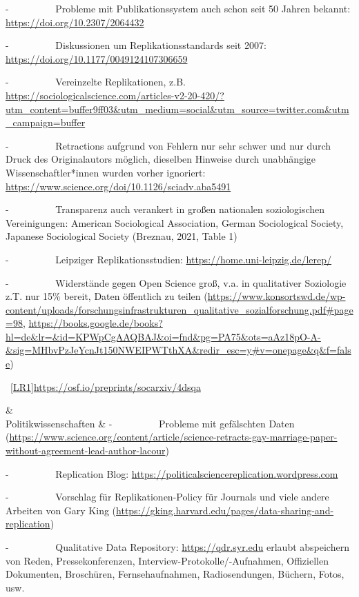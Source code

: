 \documentclass[
  letterpaper,
  DIV=11,
  numbers=noendperiod]{scrreprt}
\begin{document}
\begin{longtable}[]
\begin{minipage}[t]{\linewidth}
-~~~~~~~~~ Probleme mit Publikationssystem auch schon seit 50 Jahren
bekannt: \url{https://doi.org/10.2307/2064432}

-~~~~~~~~~ Diskussionen um Replikationsstandards seit 2007:
\url{https://doi.org/10.1177/0049124107306659}

-~~~~~~~~~ Vereinzelte Replikationen, z.B.
\url{https://sociologicalscience.com/articles-v2-20-420/?utm_content=buffer9ff03&utm_medium=social&utm_source=twitter.com&utm_campaign=buffer}

-~~~~~~~~~ Retractions aufgrund von Fehlern nur sehr schwer und nur
durch Druck des Originalautors möglich, dieselben Hinweise durch
unabhängige Wissenschaftler*innen wurden vorher ignoriert:
\url{https://www.science.org/doi/10.1126/sciadv.aba5491}

-~~~~~~~~~ Transparenz auch verankert in großen nationalen
soziologischen Vereinigungen: American Sociological Association, German
Sociological Society, Japanese Sociological Society (Breznau, 2021,
Table 1)

-~~~~~~~~~ Leipziger Replikationsstudien:
\url{https://home.uni-leipzig.de/lerep/}

-~~~~~~~~~ Widerstände gegen Open Science groß, v.a. in qualitativer
Soziologie\\
z.T. nur 15\% bereit, Daten öffentlich zu teilen
(\url{https://www.konsortswd.de/wp-content/uploads/forschungsinfrastrukturen_qualitative_sozialforschung.pdf\#page=98},
\url{https://books.google.de/books?hl=de&lr=&id=KPWpCgAAQBAJ&oi=fnd&pg=PA75&ots=aAz18pO-A-&sig=MHbvPzJeYcnJt150NWEIPWTthXA&redir_esc=y\#v=onepage&q&f=false})

~\hyperref[_msoanchor_1]{{[}LR1{]}}\url{https://osf.io/preprints/socarxiv/4dsqa}\strut
\end{minipage} & \\
Politikwissenschaften & -~~~~~~~~~ Probleme mit gefälschten Daten
(\url{https://www.science.org/content/article/science-retracts-gay-marriage-paper-without-agreement-lead-author-lacour})

-~~~~~~~~~ Replication Blog:
\url{https://politicalsciencereplication.wordpress.com}

-~~~~~~~~~ Vorschlag für Replikationen-Policy für Journals und viele
andere Arbeiten von Gary King
(\url{https://gking.harvard.edu/pages/data-sharing-and-replication})

-~~~~~~~~~ Qualitative Data Repository: \url{https://qdr.syr.edu}
erlaubt abspeichern von Reden, Pressekonferenzen,
Interview-Protokolle/-Aufnahmen, Offiziellen Dokumenten, Broschüren,
Fernsehaufnahmen, Radiosendungen, Büchern, Fotos, usw.


\end{longtable}
\end{document}
